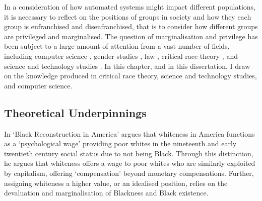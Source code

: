 In a consideration of how automated systems might impact different populations, it is necessary to reflect on the positions of groups in society and how they each group is enfranchised and disenfranchised, that is to consider how different groups are privileged and marginalised.
The question of marginalisation and privilege has been subject to a large amount of attention from a vast number of fields, including computer science \citep{Bender:2021,Dinan:2020,Mitchell:2019}, gender studies \citep{McIntosh:1988,Mohanty:1984}, law \citep{Crenshaw:1989}, critical race theory \citep{Benjamin:2019,Myers:2019}, and science and technology studies \citep{Haraway:1988}.
In this chapter, and in this dissertation, I draw on the knowledge produced in critical race theory, science and technology studies, and computer science.

\subsection{Theoretical Underpinnings}

In `Black Reconstruction in America' \citet{Dubois:1935} argues that whiteness in America functions as a `psychological wage' providing poor whites in the nineteenth and early twentieth century social status due to not being Black. Through this distinction, he argues that whiteness offers a wage to poor whites who are similarly exploited by capitalism, offering `compensation' beyond monetary compensations. Further, assigning whiteness a higher value, or an idealised position, relies on the devaluation and marginalisation of Blackness and Black existence.


